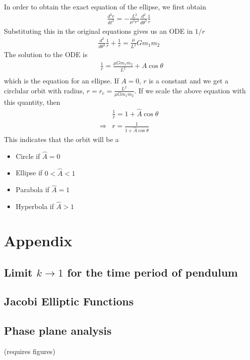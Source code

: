 \documentclass[11pt,a4paper]{article}
\newcommand{\1}{\vect{1}}
\newcommand{\dd}[2]{\frac{d #1}{d #2}}
\newcommand{\RA}{\Rightarrow}
\begin{document}
In order to obtain the exact equation of the ellipse, we first obtain
\begin{align*}
\dd{^2r}{t^2} = -\frac{L^2}{\mu^2 r^2}\frac{d^2}{d\theta^2}\frac{1}{r}
\end{align*}
Substituting this in the original equations gives us an ODE in $1/r$
\begin{align*}
\frac{d^2}{d\theta^2}\frac{1}{r} + \frac{1}{r} = \frac{\mu}{L^2} G m_1 m_2
\end{align*}
The solution to the ODE is
\begin{align*}
& \frac{1}{r} = \frac{\mu G m_1 m_2}{L^2} + A\cos\theta\\
\end{align*}
which is the equation for an ellipse. If $A = 0$, $r$ is a constant and we get a circlular orbit with radius, $r=r_c=\frac{L^2}{\mu G m_1 m_2}$. If we scale the above equation with this quantity, then
\begin{align*}
& \frac{1}{\hat{r}} = 1 + \hat{A}\cos\theta\\
\RA & r =\frac{1}{1 + \hat{A}\cos\theta}
\end{align*}
This indicates that the orbit will be a
\begin{itemize}
\item Circle if $\hat{A} = 0$
\item Ellipse if $0 < \hat{A} < 1$
\item Parabola if $\hat{A} = 1$
\item Hyperbola if $\hat{A} > 1$
\end{itemize}

\section{Appendix}

\subsection{Limit $k \to 1$ for the time period of pendulum}

\subsection{Jacobi Elliptic Functions}

\subsection{Phase plane analysis}
(requires figures)
\end{document}
